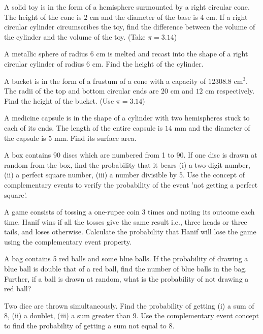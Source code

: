 \documentclass[12pt,a4paper]{exam}
\begin{document}
\begin{questions}
\question[5] A solid toy is in the form of a hemisphere surmounted by a right circular cone. The height of the cone is $2$ cm and the diameter of the base is $4$ cm. If a right circular cylinder circumscribes the toy, find the difference between the volume of the cylinder and the volume of the toy. (Take $\pi = 3.14$)
\vspace{0.15cm}

\question[5] A metallic sphere of radius $6$ cm is melted and recast into the shape of a right circular cylinder of radius $6$ cm. Find the height of the cylinder.
\vspace{0.15cm}

\question[5] A bucket is in the form of a frustum of a cone with a capacity of $12308.8 \text{ cm}^3$. The radii of the top and bottom circular ends are $20$ cm and $12$ cm respectively. Find the height of the bucket. (Use $\pi = 3.14$)
\vspace{0.15cm}

\question[5] A medicine capsule is in the shape of a cylinder with two hemispheres stuck to each of its ends. The length of the entire capsule is $14$ mm and the diameter of the capsule is $5$ mm. Find its surface area.
\vspace{0.15cm}

\question[5] A box contains 90 discs which are numbered from 1 to 90. If one disc is drawn at random from the box, find the probability that it bears (i) a two-digit number, (ii) a perfect square number, (iii) a number divisible by 5. Use the concept of complementary events to verify the probability of the event 'not getting a perfect square'.
\vspace{0.15cm}

\question[5] A game consists of tossing a one-rupee coin 3 times and noting its outcome each time. Hanif wins if all the tosses give the same result i.e., three heads or three tails, and loses otherwise. Calculate the probability that Hanif will lose the game using the complementary event property.
\vspace{0.15cm}

\question[5] A bag contains 5 red balls and some blue balls. If the probability of drawing a blue ball is double that of a red ball, find the number of blue balls in the bag. Further, if a ball is drawn at random, what is the probability of not drawing a red ball?
\vspace{0.15cm}

\question[5] Two dice are thrown simultaneously. Find the probability of getting (i) a sum of 8, (ii) a doublet, (iii) a sum greater than 9. Use the complementary event concept to find the probability of getting a sum not equal to 8.
\vspace{0.15cm}

\end{questions}
\bigskip
\end{document}
